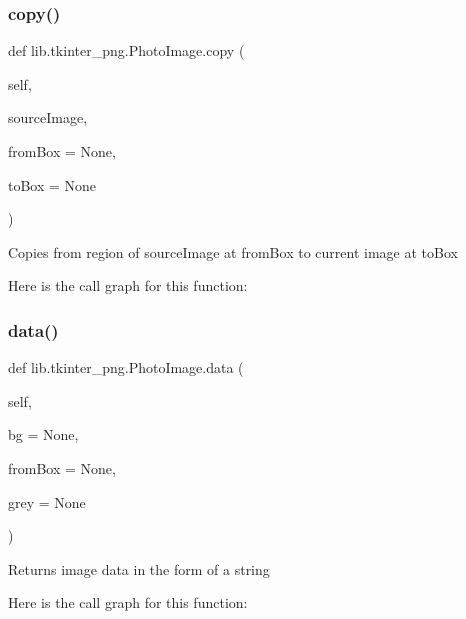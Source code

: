\subsubsection{\texorpdfstring{copy()}{copy()}}
{\footnotesize\ttfamily def lib.\+tkinter\+\_\+png.\+Photo\+Image.\+copy (\begin{DoxyParamCaption}\item[{}]{self,  }\item[{}]{source\+Image,  }\item[{}]{from\+Box = {\ttfamily None},  }\item[{}]{to\+Box = {\ttfamily None} }\end{DoxyParamCaption})}

\begin{DoxyVerb}Copies from region of sourceImage at fromBox to current image at toBox\end{DoxyVerb}
 Here is the call graph for this function\+:
\mbox{\label{classlib_1_1tkinter__png_1_1_photo_image_a6530df43984a11c68cb2f6de19a3d29e}} 
\subsubsection{\texorpdfstring{data()}{data()}}
{\footnotesize\ttfamily def lib.\+tkinter\+\_\+png.\+Photo\+Image.\+data (\begin{DoxyParamCaption}\item[{}]{self,  }\item[{}]{bg = {\ttfamily None},  }\item[{}]{from\+Box = {\ttfamily None},  }\item[{}]{grey = {\ttfamily None} }\end{DoxyParamCaption})}

\begin{DoxyVerb}Returns image data in the form of a string\end{DoxyVerb}
 Here is the call graph for this function\+:
\mbox{\label{classlib_1_1tkinter__png_1_1_photo_image_a34f1f41b8e463218780f7eb4bcb7c4a9}} 
